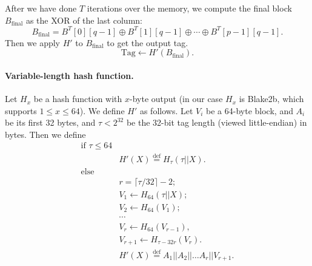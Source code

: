 \documentclass[a4paper]{article}
\begin{document}
After we have done  $T$ iterations over the memory, we compute the final block $B_{\mathrm{final}}$ as the XOR of the last column:
$$
B_{\mathrm{final}} = B^T[0][q-1] \oplus B^T[1][q-1]\oplus \cdots\oplus B^T[p-1][q-1].
$$
Then we apply $H'$ to $B_{\mathrm{final}}$ to get the output tag.
$$
\text{Tag} \leftarrow H'(B_{\mathrm{final}}).
$$


\paragraph{Variable-length hash function.} Let $H_x$ be a hash function with $x$-byte output (in our case $H_x$ is Blake2b, which supports $1\leq x \leq 64$). We define $H'$ as follows. Let $V_i$ be a 64-byte block, and  $A_i$ be its first 32 bytes,
and $\tau<2^{32}$ be the 32-bit tag length (viewed little-endian) in bytes. 
Then we define
$$
\begin{array}{rl}
\text{if }\tau \leq 64&\\& H'(X) \overset{\text{def}}{=} H_{\tau}(\tau ||X).\\
\text{else}&\\
& r = \lceil\tau/32\rceil-2;\\
&V_1\leftarrow H_{64}(\tau||X);\\
&V_2 \leftarrow H_{64}(V_1);\\
&\cdots\\
&V_r  \leftarrow H_{64}(V_{r-1}),\\
&V_{r+1} \leftarrow H_{\tau - 32r}(V_{r}).\\
&H'(X) \overset{\text{def}}{=} A_1||A_2||\ldots A_r||V_{r+1}.
\end{array}
$$
\end{document}
